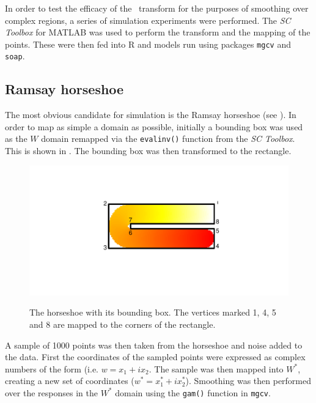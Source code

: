 In order to test the efficacy of the \sch\ transform for the purposes of smoothing over complex regions, a series of simulation experiments were performed. The \emph{SC Toolbox} for MATLAB was used to perform the transform and the mapping of the points. These were then fed into \textsf{R} and models run using packages \texttt{mgcv} and \texttt{soap}.

\subsection{Ramsay horseshoe}

The most obvious candidate for simulation is the Ramsay horseshoe (see ). In order to map as simple a domain as possible, initially a bounding box was used as the $W$ domain remapped via the \texttt{evalinv()} function from the \emph{SC Toolbox}. This is shown in . The bounding box was then transformed to the rectangle. 

\begin{figure}
\centering
\includegraphics[trim=0.5in 1in 0in 0.5in]{sc/figs/hswithboundingbox.pdf} \\
\caption{The horseshoe with its bounding box. The vertices marked 1, 4, 5 and 8 are mapped to the corners of the rectangle.}
\label{hswithboundingbox}
\end{figure}

A sample of 1000 points was then taken from the horseshoe and noise added to the data. First the coordinates of the sampled points were expressed as complex numbers of the form (i.e. $w=x_1+ix_2$. The sample was then mapped into $W^*$, creating a new set of coordinates ($w^*=x_1^*+ix_2^*$). Smoothing was then performed over the responses in the $W^*$ domain using the \texttt{gam()} function in \texttt{mgcv}. 

